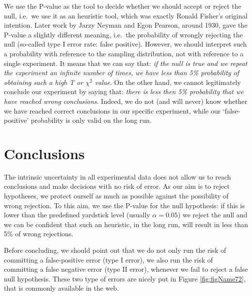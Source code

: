 \documentclass[a4paper,12pt,oneside]{book}
\begin{document}
We use the P-value as the tool to decide whether we should accept or reject the null, i.e.~we use it as an heuristic tool, which was exactly Ronald Fisher's original intention. Later work by Jarzy Neyman and Egon Pearson, around 1930, gave the P-value a slightly different meaning, i.e.~the probability of wrongly rejecting the null (so-called type I error rate: false positive). However, we should interpret such a probability with reference to the sampling distribution, not with reference to a single experiment. It means that we can say that: \emph{if the null is true and we repeat the experiment an infinite number of times, we have less than 5\% probability of obtaining such a high T or \(\chi^2\) value}. On the other hand, we cannot legitimately conclude our experiment by saying that: \emph{there is less then 5\% probability that we have reached wrong conclusions}. Indeed, we do not (and will never) know whether we have reached correct conclusions in our specific experiment, while our `false-positive' probability is only valid on the long run.

\hypertarget{conclusions-3}{%
\section{Conclusions}\label{conclusions-3}}

The intrinsic uncertainty in all experimental data does not allow us to reach conclusions and make decisions with no risk of error. As our aim is to reject hypotheses, we protect ourself as much as possible against the possibility of wrong rejection. To this aim, we use the P-value for the null hypothesis: if this is lower than the predefined yardstick level (usually \(\alpha = 0.05\)) we reject the null and we can be confident that such an heuristic, in the long run, will result in less than 5\% of wrong rejections.

Before concluding, we should point out that we do not only run the risk of committing a false-positive error (type I error), we also run the risk of committing a false negative error (type II error), whenever we fail to reject a false null hypothesis. These two type of errors are nicely put in Figure \ref{fig:figName72}, that is commonly available in the web.
\end{document}
